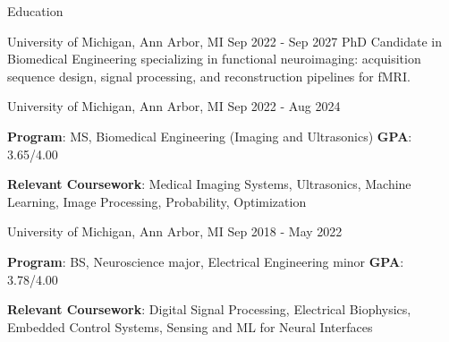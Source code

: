 \documentclass{resume}
\begin{document}
\begin{rSection}{Education}
\begin{rSubsection}{University of Michigan}{, Ann Arbor, MI \hfill {Sep 2022 - Sep 2027}}
	PhD Candidate in Biomedical Engineering specializing in functional neuroimaging: acquisition sequence design, signal processing, and reconstruction pipelines for fMRI.
\end{rSubsection}
\begin{rSubsection}{University of Michigan}{, Ann Arbor, MI \hfill {Sep 2022 - Aug 2024}}
	\item \textbf{Program}: MS, Biomedical Engineering (Imaging and Ultrasonics) \hfill{\textbf{GPA}: 3.65/4.00}
    \item{\textbf{Relevant Coursework}: Medical Imaging Systems, Ultrasonics, Machine Learning, Image Processing, Probability, Optimization}
\end{rSubsection}
\begin{rSubsection}{University of Michigan}{, Ann Arbor, MI \hfill {Sep 2018 - May 2022}}
	\item{\textbf{Program}: BS, Neuroscience major, Electrical Engineering minor} \hfill{\textbf{GPA}: 3.78/4.00}
    \item{\textbf{Relevant Coursework}: Digital Signal Processing, Electrical Biophysics, Embedded Control Systems, Sensing and ML for Neural Interfaces}
\end{rSubsection}
\end{rSection}
\end{document}
